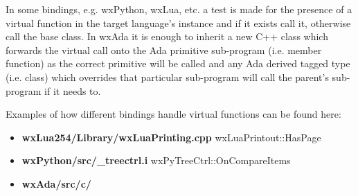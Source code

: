 In some bindings, e.g. wxPython, wxLua, etc. a test is made for the presence of a virtual function in the target language's instance and
if it exists call it, otherwise call the base class. In wxAda it is enough to inherit a new C++ class which forwards the virtual call onto
the Ada primitive sub-program (i.e. member function) as the correct primitive will be called and any Ada derived tagged type (i.e. class)
which overrides that particular sub-program will call the parent's sub-program if it needs to.

Examples of how different bindings handle virtual functions can be found here:

\begin{itemize}\itemsep=0pt
\item{\bf wxLua254/Library/wxLuaPrinting.cpp} wxLuaPrintout::HasPage
\item{\bf wxPython/src/_treectrl.i} wxPyTreeCtrl::OnCompareItems
\item{\bf wxAda/src/c/} 
\end{itemize}


